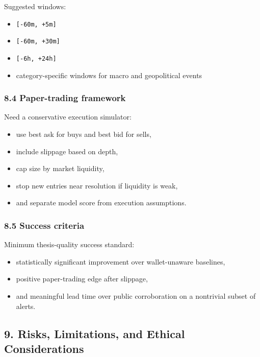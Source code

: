 \documentclass[
]{article}
\providecommand{\tightlist}{%
  \setlength{\itemsep}{0pt}\setlength{\parskip}{0pt}}
\begin{document}
Suggested windows:

\begin{itemize}
\tightlist
\item
  \texttt{{[}-60m,\ +5m{]}}
\item
  \texttt{{[}-60m,\ +30m{]}}
\item
  \texttt{{[}-6h,\ +24h{]}}
\item
  category-specific windows for macro and geopolitical events
\end{itemize}

\subsubsection{8.4 Paper-trading
framework}\label{84-paper-trading-framework}

Need a conservative execution simulator:

\begin{itemize}
\tightlist
\item
  use best ask for buys and best bid for sells,
\item
  include slippage based on depth,
\item
  cap size by market liquidity,
\item
  stop new entries near resolution if liquidity is weak,
\item
  and separate model score from execution assumptions.
\end{itemize}

\subsubsection{8.5 Success criteria}\label{85-success-criteria}

Minimum thesis-quality success standard:

\begin{itemize}
\tightlist
\item
  statistically significant improvement over wallet-unaware baselines,
\item
  positive paper-trading edge after slippage,
\item
  and meaningful lead time over public corroboration on a nontrivial
  subset of alerts.
\end{itemize}

\subsection{9. Risks, Limitations, and Ethical
Considerations}\label{9-risks-limitations-and-ethical-considerations}
\end{document}
